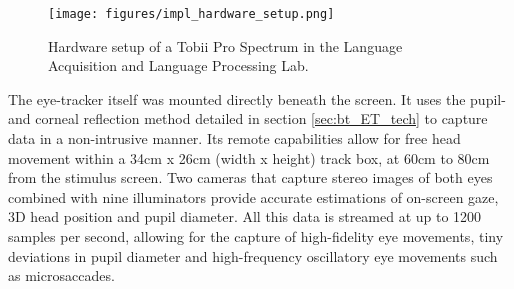 \begin{figure}[h]
    \centering
    \texttt{[image: figures/impl\_hardware\_setup.png]}
    \caption{Hardware setup of a Tobii Pro Spectrum in the Language Acquisition and Language Processing Lab.}
    \label{fig:impl_hardware_setup}
\end{figure}

The eye-tracker itself was mounted directly beneath the screen. It uses the pupil- and corneal reflection method detailed in section \ref{sec:bt_ET_tech} to capture data in a non-intrusive manner. Its remote capabilities allow for free head movement within a 34cm x 26cm (width x height) track box, at 60cm to 80cm from the stimulus screen. Two cameras that capture stereo images of both eyes combined with nine illuminators provide accurate estimations of on-screen gaze, 3D head position and pupil diameter. All this data is streamed at up to 1200 samples per second, allowing for the capture of high-fidelity eye movements, tiny deviations in pupil diameter and high-frequency oscillatory eye movements such as microsaccades. 